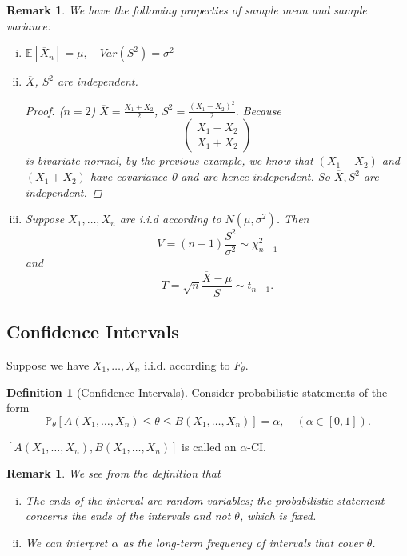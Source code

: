 \documentclass{tufte-handout}
\newcommand*\E{\mathbb{E}}
\renewcommand{\P}{\mathbb{P}}
\newtheorem{rmk}[thm]{Remark}
\theoremstyle{definition}
\newtheorem{defn}[thm]{Definition}
\begin{document}
\begin{rmk}
	We have the following properties of sample mean and sample variance:

	\begin{enumerate}[(i)]
		\item $\E\left[\overline{X}_n\right] = \mu, \quad Var(S^2) = \sigma^2$
		\item $\overline{X}$, $S^2$ are independent. 
			\begin{proof}
				($n=2$) $\overline{X} = \frac{X_1+X_2}{2}$, $S^2 = \frac{(X_1-X_2)^2}{2}.$
				Because \[
					\begin{pmatrix}
					X_1-X_2 \\
					X_1 + X_2
					\end{pmatrix} 
				\] is bivariate normal, by the previous example, we know that $(X_1-X_2)$ and $(X_1+X_2)$ have covariance 0 and are hence independent. So $\overline{X}, S^2$ are independent.
			\end{proof}
		\item Suppose $X_1,\ldots,X_n$ are i.i.d according to $N(\mu,\sigma^2)$.
			Then \[
				V = (n-1) \frac{S^2}{\sigma^2} \sim  \chi^2_{n-1}
			\] and \[
				T = \sqrt{n} \frac{\overline{X}-\mu}{S} \sim t_{n-1}
			.\] 
	\end{enumerate}
\end{rmk}

\subsection{Confidence Intervals}
Suppose we have $X_1,\ldots,X_n$ i.i.d. according to $F_\theta$. 

\begin{defn}[Confidence Intervals]
	Consider probabilistic statements of the form \[
	\P_\theta\left[ A(X_1,\ldots,X_n) \le \theta \le B(X_1,\ldots,X_n) \right] = \alpha, \quad (\alpha \in [0,1]) .\]
	 
	$\left[ A(X_1,\ldots,X_n), B(X_1,\ldots,X_n) \right] $ is called an $\alpha$-CI.
\end{defn}

\begin{rmk}
	We see from the definition that
	\begin{enumerate}[(i)]
		\item The ends of the interval are random variables; the probabilistic statement concerns the ends of the intervals and \emph{not} $\theta$, which is fixed.
		\item We can interpret $\alpha$ as the long-term frequency of intervals that cover $\theta$.
	\end{enumerate}
\end{rmk}
\end{document}
